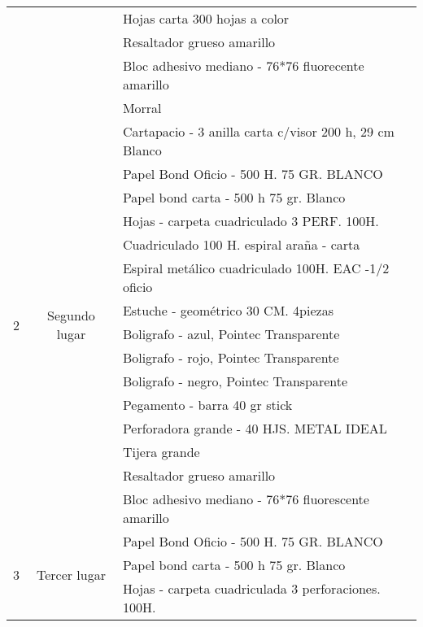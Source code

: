 \documentclass{article}
\begin{document}
\begin{table}[htbp]
{\begin{tabular}{|c|c|l|}
\cmidrule{3-3}          &       & Hojas carta 300 hojas a color \\
\cmidrule{3-3}          &       & Resaltador grueso amarillo \\
\cmidrule{3-3}          &       & Bloc adhesivo mediano - 76*76 fluorecente amarillo \\
\cmidrule{3-3}          &       & Morral  \\
    \midrule
    \multirow{15}[30]{*}{2} & \multirow{15}[30]{*}{Segundo lugar} & Cartapacio - 3 anilla carta c/visor 200 h, 29 cm Blanco \\
\cmidrule{3-3}          &       & Papel Bond Oficio - 500 H. 75 GR. BLANCO \\
\cmidrule{3-3}          &       & Papel bond carta - 500 h 75 gr. Blanco \\
\cmidrule{3-3}          &       & Hojas - carpeta cuadriculado 3 PERF. 100H. \\
\cmidrule{3-3}          &       & Cuadriculado 100 H. espiral araña - carta \\
\cmidrule{3-3}          &       & Espiral metálico cuadriculado 100H. EAC -1/2 oficio \\
\cmidrule{3-3}          &       & Estuche - geométrico 30 CM. 4piezas \\
\cmidrule{3-3}          &       & Boligrafo - azul, Pointec Transparente \\
\cmidrule{3-3}          &       & Boligrafo - rojo, Pointec Transparente \\
\cmidrule{3-3}          &       & Boligrafo - negro, Pointec Transparente \\
\cmidrule{3-3}          &       & Pegamento - barra 40 gr stick \\
\cmidrule{3-3}          &       & Perforadora grande - 40 HJS. METAL IDEAL \\
\cmidrule{3-3}          &       & Tijera grande \\
\cmidrule{3-3}          &       & Resaltador grueso amarillo \\
\cmidrule{3-3}          &       & Bloc adhesivo mediano - 76*76 fluorescente amarillo \\
    \midrule
    \multirow{10}[20]{*}{3} & \multirow{10}[20]{*}{Tercer lugar} & Papel Bond Oficio - 500 H. 75 GR. BLANCO \\
\cmidrule{3-3}          &       & Papel bond carta - 500 h 75 gr. Blanco \\
\cmidrule{3-3}          &       & Hojas - carpeta cuadriculada 3 perforaciones. 100H. \\

\end{tabular}}
\end{table}
\end{document}
